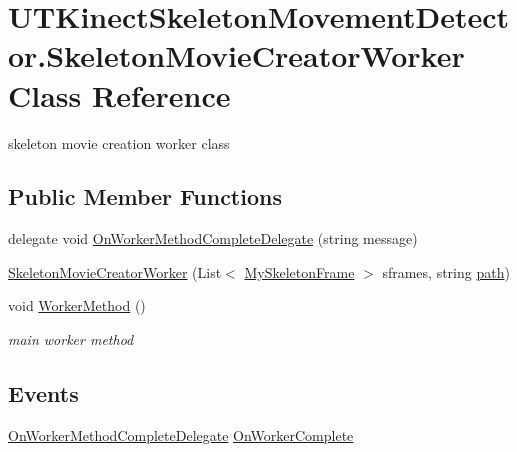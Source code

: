\hypertarget{classUTKinectSkeletonMovementDetector_1_1SkeletonMovieCreatorWorker}{\section{U\-T\-Kinect\-Skeleton\-Movement\-Detector.\-Skeleton\-Movie\-Creator\-Worker Class Reference}
\label{classUTKinectSkeletonMovementDetector_1_1SkeletonMovieCreatorWorker}
}


skeleton movie creation worker class  


\subsection*{Public Member Functions}
\begin{DoxyCompactItemize}
\item 
delegate void \hyperlink{classUTKinectSkeletonMovementDetector_1_1SkeletonMovieCreatorWorker_a688da7c69b3fcbbd1cdb3b9a4cfcb1d7}{On\-Worker\-Method\-Complete\-Delegate} (string message)
\item 
\hyperlink{classUTKinectSkeletonMovementDetector_1_1SkeletonMovieCreatorWorker_aec611bcc2c202380be2b9f47fe846646}{Skeleton\-Movie\-Creator\-Worker} (List$<$ \hyperlink{classUTKinectSkeletonMovementDetector_1_1MySkeletonFrame}{My\-Skeleton\-Frame} $>$ sframes, string \hyperlink{classUTKinectSkeletonMovementDetector_1_1SkeletonMovieCreatorWorker_a75e2c6a66d2a6501da399c2b244140e8}{path})
\item 
void \hyperlink{classUTKinectSkeletonMovementDetector_1_1SkeletonMovieCreatorWorker_a15f5b8ffdfcda85af30cc0a59fc01017}{Worker\-Method} ()
\begin{DoxyCompactList}\small\item\em main worker method \end{DoxyCompactList}\end{DoxyCompactItemize}
\subsection*{Events}
\begin{DoxyCompactItemize}
\item 
\hyperlink{classUTKinectSkeletonMovementDetector_1_1SkeletonMovieCreatorWorker_a688da7c69b3fcbbd1cdb3b9a4cfcb1d7}{On\-Worker\-Method\-Complete\-Delegate} \hyperlink{classUTKinectSkeletonMovementDetector_1_1SkeletonMovieCreatorWorker_a216a708362bfed5567535e47a6124dfb}{On\-Worker\-Complete}
\end{DoxyCompactItemize}
